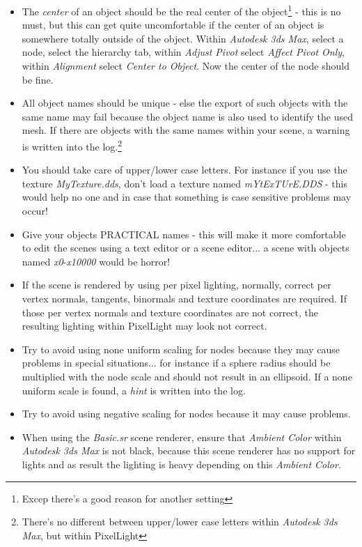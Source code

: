 \begin{itemize}
\item{The \emph{center} of an object should be the real center of the object\footnote{Excep there's a good reason for another setting} - this is no must, but this can get quite uncomfortable if the center of an object is somewhere totally outside of the object. Within \emph{Autodesk 3ds Max}, select a node, select the hierarchy tab, within \emph{Adjust Pivot} select \emph{Affect Pivot Only}, within \emph{Alignment} select \emph{Center to Object}. Now the center of the node should be fine.}
\item{All object names should be unique - else the export of such objects with the same name may fail because the object name is also used to identify the used mesh. If there are objects with the same names within your scene, a warning is written into the log.\footnote{There's no different between upper/lower case letters within \emph{Autodesk 3ds Max}, but within PixelLight}}
\item{You should take care of upper/lower case letters. For instance if you use the texture \emph{MyTexture.dds}, don't load a texture named \emph{mYtExTUrE.DDS} - this would help no one and in case that something is case sensitive problems may occur!}
\item{Give your objects PRACTICAL names - this will make it more comfortable to edit the scenes using a text editor or a scene editor... a scene with objects named \emph{x0}-\emph{x10000} would be horror!}
\item{If the scene is rendered by using per pixel lighting, normally, correct per vertex normals, tangents, binormals and texture coordinates are required. If those per vertex normals and texture coordinates are not correct, the resulting lighting within PixelLight may look not correct.}
\item{Try to avoid using none uniform scaling for nodes because they may cause problems in special situations... for instance if a sphere radius should be multiplied with the node scale and should not result in an ellipsoid. If a none uniform scale is found, a \emph{hint} is written into the log.}
\item{Try to avoid using negative scaling for nodes because it may cause problems.}
\item{When using the \emph{Basic.sr} scene renderer, ensure that \emph{Ambient Color} within \emph{Autodesk 3ds Max} is not black, because this scene renderer has no support for lights and as result the lighting is heavy depending on this \emph{Ambient Color}.}
\end{itemize}
